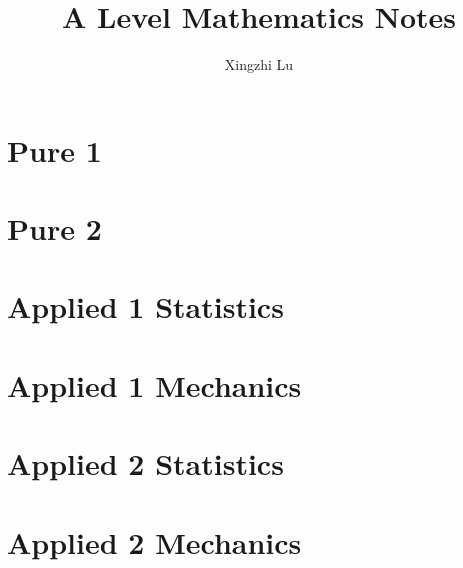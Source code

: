 \documentclass[oneside,fleqn,11pt]{book}
\title{A Level Mathematics Notes}
\author{Xingzhi Lu}
\date{}
\begin{document}
\everymath{\displaystyle}
\maketitle
\tableofcontents

\part{Pure 1}


\part{Pure 2}
\setcounter{chapter}{0}


\part{Applied 1 Statistics}
\setcounter{chapter}{0}


\part{Applied 1 Mechanics}
\setcounter{chapter}{7}


\part{Applied 2 Statistics}
\setcounter{chapter}{0}


\part{Applied 2 Mechanics}
\setcounter{chapter}{3}

\end{document}
